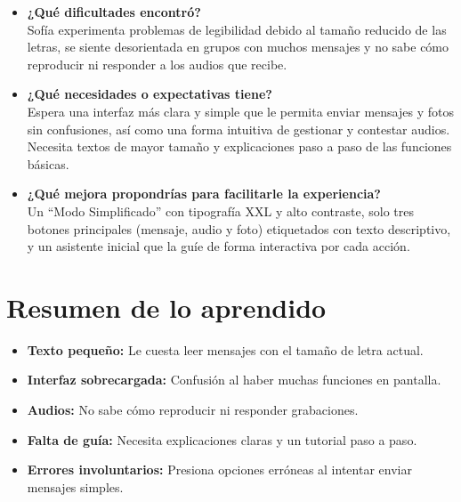 \documentclass{article}
\begin{document}
\begin{itemize}
  \item \textbf{¿Qué dificultades encontró?}\\
        Sofía experimenta problemas de legibilidad debido al tamaño reducido de las letras, se siente desorientada en grupos con muchos mensajes y no sabe cómo reproducir ni responder a los audios que recibe.
        
  \item \textbf{¿Qué necesidades o expectativas tiene?}\\
        Espera una interfaz más clara y simple que le permita enviar mensajes y fotos sin confusiones, así como una forma intuitiva de gestionar y contestar audios. Necesita textos de mayor tamaño y explicaciones paso a paso de las funciones básicas.
        
  \item \textbf{¿Qué mejora propondrías para facilitarle la experiencia?}\\
        Un “Modo Simplificado” con tipografía XXL y alto contraste, solo tres botones principales (mensaje, audio y foto) etiquetados con texto descriptivo, y un asistente inicial que la guíe de forma interactiva por cada acción.
\end{itemize}

\section*{Resumen de lo aprendido}
\begin{itemize}
  \item \textbf{Texto pequeño:} Le cuesta leer mensajes con el tamaño de letra actual.
  \item \textbf{Interfaz sobrecargada:} Confusión al haber muchas funciones en pantalla.
  \item \textbf{Audios:} No sabe cómo reproducir ni responder grabaciones.
  \item \textbf{Falta de guía:} Necesita explicaciones claras y un tutorial paso a paso.
  \item \textbf{Errores involuntarios:} Presiona opciones erróneas al intentar enviar mensajes simples.
\end{itemize}

\end{document}
